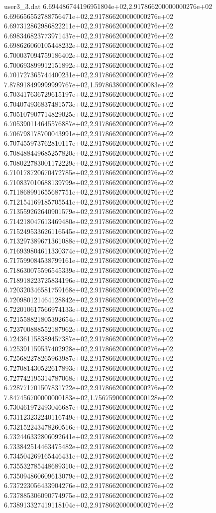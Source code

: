 \begin{filecontents}{user3_3.dat}
6.694486744196951804e+02,2.917866200000000276e+02
6.696656552788756471e+02,2.917866200000000276e+02
6.697312862986822211e+02,2.917866200000000276e+02
6.698346823773971437e+02,2.917866200000000276e+02
6.698626060105448232e+02,2.917866200000000276e+02
6.700037094759186402e+02,2.917866200000000276e+02
6.700693899912151892e+02,2.917866200000000276e+02
6.701727365744400231e+02,2.917866200000000276e+02
7.878918499999999767e+02,1.597863800000000083e+02
6.703417636729615197e+02,2.917866200000000276e+02
6.704074936837481573e+02,2.917866200000000276e+02
6.705107907714829025e+02,2.917866200000000276e+02
6.705390114645576887e+02,2.917866200000000276e+02
6.706798178700043991e+02,2.917866200000000276e+02
6.707455973762810117e+02,2.917866200000000276e+02
6.708488449685257820e+02,2.917866200000000276e+02
6.708022783001172229e+02,2.917866200000000276e+02
6.710178720670472785e+02,2.917866200000000276e+02
6.710837010688139799e+02,2.917866200000000276e+02
6.711868991655687751e+02,2.917866200000000276e+02
6.712154169185705541e+02,2.917866200000000276e+02
6.713559262640901579e+02,2.917866200000000276e+02
6.714218047613469480e+02,2.917866200000000276e+02
6.715249533626116545e+02,2.917866200000000276e+02
6.713297389671361088e+02,2.917866200000000276e+02
6.716939804611330374e+02,2.917866200000000276e+02
6.717599084538799161e+02,2.917866200000000276e+02
6.718630075596545339e+02,2.917866200000000276e+02
6.718918223725834196e+02,2.917866200000000276e+02
6.720320346581759168e+02,2.917866200000000276e+02
6.720980121464128842e+02,2.917866200000000276e+02
6.722010617566974133e+02,2.917866200000000276e+02
6.721558821805392654e+02,2.917866200000000276e+02
6.723700888552187962e+02,2.917866200000000276e+02
6.724361158389457387e+02,2.917866200000000276e+02
6.725391159537402928e+02,2.917866200000000276e+02
6.725682278265963987e+02,2.917866200000000276e+02
6.727081430522617893e+02,2.917866200000000276e+02
6.727742195314787068e+02,2.917866200000000276e+02
6.728771701507831722e+02,2.917866200000000276e+02
7.847456700000000183e+02,1.756759000000000128e+02
6.730461972493046687e+02,2.917866200000000276e+02
6.731123232240116749e+02,2.917866200000000276e+02
6.732152243478260516e+02,2.917866200000000276e+02
6.732446332806092641e+02,2.917866200000000276e+02
6.733842514463475482e+02,2.917866200000000276e+02
6.734504269165446431e+02,2.917866200000000276e+02
6.735532785448689310e+02,2.917866200000000276e+02
6.735094860609613079e+02,2.917866200000000276e+02
6.737223056433904276e+02,2.917866200000000276e+02
6.737885306090774975e+02,2.917866200000000276e+02
6.738913327419118104e+02,2.917866200000000276e+02

\end{filecontents}
